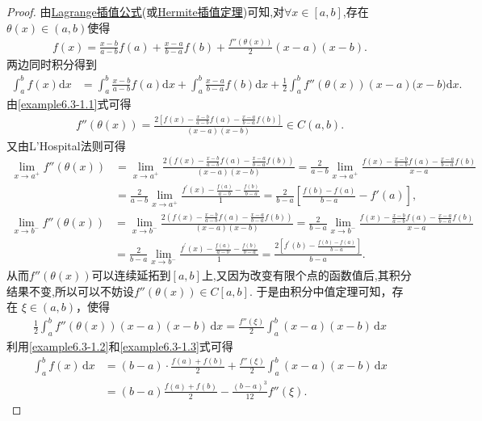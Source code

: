 \documentclass[../../main.tex]{subfiles}%
\begin{document}
\begin{proof}

由\hyperref[proposition:Lagrange插值公式]{Lagrange插值公式}(或\hyperref[theorem:Hermite插值定理]{Hermite插值定理})可知,对$\forall x\in [a,b]$,存在$\theta (x)\in (a,b)$使得
\begin{align}\label{example6.3-1.1}
f(x) = \frac{x - b}{a - b} f(a) + \frac{x - a}{b - a} f(b) + \frac{f''(\theta (x))}{2} (x - a)(x - b).
\end{align}
两边同时积分得到
\begin{align}
\int_a^b{f(x)\mathrm{d}x}&=\int_a^b{\frac{x-b}{a-b}f(a)\mathrm{d}x}+\int_a^b{\frac{x-a}{b-a}f(b)\mathrm{d}x}+\frac{1}{2}\int_a^b{f'' (\theta (x) )(x-a)(x-b})\mathrm{d}x.\label{example6.3-1.2}
\end{align}
由\eqref{example6.3-1.1}式可得
\begin{align*}
f'' (\theta (x) )=\frac{2\left[ f\left( x \right) -\frac{x-b}{a-b}f(a)-\frac{x-a}{b-a}f\left( b \right) \right]}{(x-a)(x-b)}\in C\left( a,b \right) .
\end{align*}
又由L'Hospital法则可得
\begin{align*}
\underset{x\rightarrow a^+}{\lim}f'' \left( \theta \left( x \right) \right) &=\underset{x\rightarrow a^+}{\lim}\frac{2\left( f\left( x \right) -\frac{x-b}{a-b}f(a)-\frac{x-a}{b-a}f\left( b \right) \right)}{(x-a)(x-b)}=\frac{2}{a-b}\underset{x\rightarrow a^+}{\lim}\frac{f\left( x \right) -\frac{x-b}{a-b}f(a)-\frac{x-a}{b-a}f\left( b \right)}{x-a}
\\
&=\frac{2}{a-b}\lim_{x\rightarrow a^+} \frac{f^{\prime}(x)-\frac{f(a)}{a-b}-\frac{f(b)}{b-a}}{1}=\frac{2}{b-a}\left[ \frac{f\left( b \right) -f\left( a \right)}{b-a}-f' \left( a \right) \right] ,   
\end{align*}
\begin{align*}
\underset{x\rightarrow b^-}{\lim}f'' \left( \theta \left( x \right) \right) &=\underset{x\rightarrow b^-}{\lim}\frac{2\left( f(x)-\frac{x-b}{a-b}f(a)-\frac{x-a}{b-a}f(b) \right)}{(x-a)(x-b)}=\frac{2}{b-a}\underset{x\rightarrow b^-}{\lim}\frac{f\left( x \right) -\frac{x-b}{a-b}f(a)-\frac{x-a}{b-a}f\left( b \right)}{x-a}
\\
&=\frac{2}{b-a}\lim_{x\rightarrow b^-} \frac{f^{\prime}(x)-\frac{f(a)}{a-b}-\frac{f(b)}{b-a}}{1}=\frac{2\left[ f^{\prime}(b)-\frac{f(b)-f(a)}{b-a} \right]}{b-a}.   
\end{align*}
从而$f'' \left( \theta \left( x \right) \right)$可以连续延拓到$[a,b]$上,又因为改变有限个点的函数值后,其积分结果不变,所以可以不妨设$f''(\theta(x))\in C[a,b]$.
于是由积分中值定理可知，存在 $\xi \in (a, b)$，使得
\begin{align}
\frac{1}{2} \int_a^b f''(\theta (x)) (x-a)(x-b) \, \mathrm{d}x = \frac{f''(\xi)}{2} \int_a^b (x-a)(x-b) \, \mathrm{d}x \label{example6.3-1.3}
\end{align}
利用\eqref{example6.3-1.2}和\eqref{example6.3-1.3}式可得
\begin{align*}
\int_a^b f(x) \, \mathrm{d}x &= (b-a) \cdot \frac{f(a) + f(b)}{2} + \frac{f''(\xi)}{2} \int_a^b (x-a)(x-b) \, \mathrm{d}x \\
&= (b-a) \frac{f(a) + f(b)}{2} - \frac{(b-a)^3}{12} f''(\xi). 
\end{align*}


\end{proof}
\end{document}
